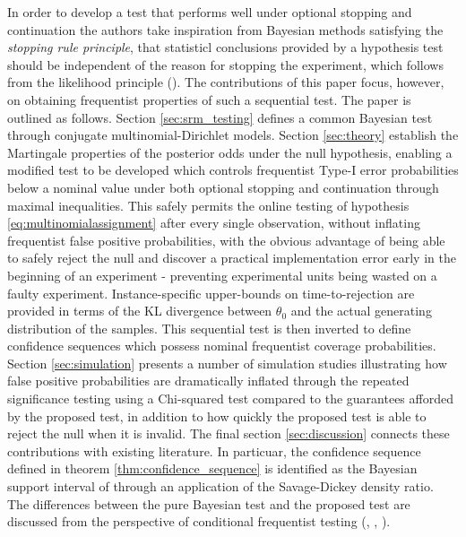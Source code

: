 \documentclass[11pt]{article}
\begin{document}
In order to develop a test that performs well under optional stopping and continuation the authors take inspiration from Bayesian methods satisfying the \textit{stopping rule principle}, that statisticl conclusions provided by a hypothesis test should be independent of the reason for stopping the experiment, which follows from the likelihood principle (\cite{likelihood}).
The contributions of this paper focus, however, on obtaining frequentist properties of such a sequential test.
The paper is outlined as follows.
Section \ref{sec:srm_testing} defines a common Bayesian test through conjugate multinomial-Dirichlet models.
Section \ref{sec:theory} establish the Martingale properties of the posterior odds under the null hypothesis, enabling a modified test to be developed which controls frequentist Type-I error probabilities below a nominal value under both optional stopping and continuation through maximal inequalities.
 This safely permits the online testing of hypothesis \eqref{eq:multinomialassignment} after every single observation, without inflating frequentist false positive probabilities, with the obvious advantage of being able to safely reject the null and discover a practical implementation error early in the beginning of an experiment - preventing experimental units being wasted on a faulty experiment.
Instance-specific upper-bounds on time-to-rejection are provided in terms of the KL divergence  between $\theta_0$ and the actual generating distribution of the samples.
This sequential test is then inverted to define confidence sequences which possess nominal frequentist coverage probabilities.
Section \ref{sec:simulation} presents a number of simulation studies illustrating how false positive probabilities are dramatically inflated through the repeated significance testing using a Chi-squared test compared to the guarantees afforded by the proposed test, in addition to how quickly the proposed test is able to reject the null when it is invalid.
The final section \ref{sec:discussion} connects these contributions with existing literature.
In particuar, the confidence sequence defined in theorem \ref{thm:confidence_sequence} is identified as the Bayesian support interval of \cite{support_interval} through an application of the Savage-Dickey density ratio.
The differences between the pure Bayesian test and the proposed test are discussed from the perspective of conditional frequentist testing (\cite{conditional_frequentist_simple}, \cite{conditional_frequentist_precise}, \cite{conditional_frequentist_composite}).
\end{document}
